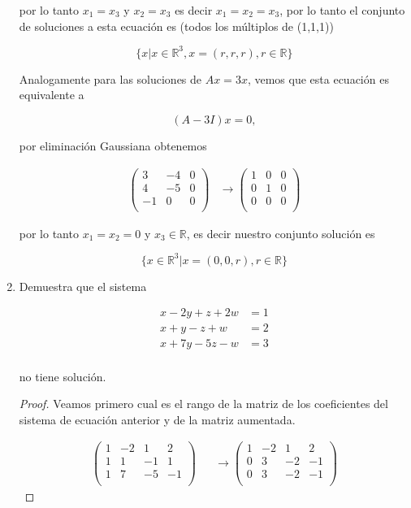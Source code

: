 \documentclass[letterpaper]{article}
\theoremstyle{definition}
\theoremstyle{lemathm}
\theoremstyle{lemademthm}
\newcommand{\R}{\mathbb{R}}
\begin{document}
\begin{enumerate}
		por lo tanto $x_1 = x_3$ y $x_2 = x_3$ es decir $x_1 = x_2 = x_3$, por lo tanto el conjunto de soluciones a esta ecuación es (todos los múltiplos de (1,1,1))

		\[\{x | x\in\R^3, x = (r, r, r), r \in \R\}\]

		Analogamente para las soluciones de $Ax = 3x$, vemos que esta ecuación es equivalente a

		\[(A-3I)x = 0,\]

		por eliminación Gaussiana obtenemos

		\begin{align*}
			\begin{pmatrix}
				3 & -4 & 0\\
				4 & -5 & 0\\
				-1 & 0 & 0\\
			\end{pmatrix}
			& \rightarrow
			\begin{pmatrix}
				1 & 0 & 0\\
				0 & 1 & 0\\
				0 & 0 & 0\\
			\end{pmatrix}
		\end{align*}

		por lo tanto $x_1 = x_2 = 0$ y $x_3 \in \R$, es decir nuestro conjunto solución es

		\[\{x \in \R^3| x = (0,0,r), r \in \R\}\]

		\newpage

		\item Demuestra que el sistema
		
		\begin{align*}
			x - 2y + z + 2w &= 1\\
			x + y - z + w &= 2\\
			x + 7y - 5z - w &= 3\\
		\end{align*}

		no tiene solución.

		\begin{proof}
			Veamos primero cual es el rango de la matriz de los coeficientes del sistema de ecuación anterior y de la matriz aumentada.

			\begin{align*}
				\begin{pmatrix}
					1 & -2 & 1 & 2\\
					1 & 1 & -1 & 1\\
					1 & 7 & -5 & -1\\
				\end{pmatrix}
				&& \rightarrow
				\begin{pmatrix}
					1 & -2 & 1 & 2\\
					0 & 3 & -2 & -1\\
					0 & 3 & -2 & -1\\
				\end{pmatrix}
			\end{align*}


\end{proof}
\end{enumerate}
\end{document}
